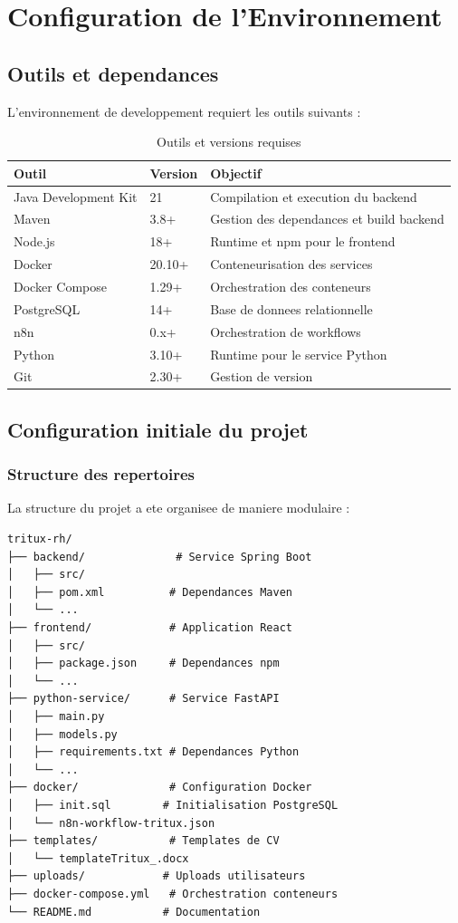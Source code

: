 \section{Configuration de l'Environnement}

\subsection{Outils et dependances}

L'environnement de developpement requiert les outils suivants :

\begin{table}[!ht]
\centering
\begin{tabular}{p{4cm}p{3cm}p{4cm}}
\toprule
\textbf{Outil} & \textbf{Version} & \textbf{Objectif} \\
\midrule
Java Development Kit & 21 & Compilation et execution du backend \\
Maven & 3.8+ & Gestion des dependances et build backend \\
Node.js & 18+ & Runtime et npm pour le frontend \\
Docker & 20.10+ & Conteneurisation des services \\
Docker Compose & 1.29+ & Orchestration des conteneurs \\
PostgreSQL & 14+ & Base de donnees relationnelle \\
n8n & 0.x+ & Orchestration de workflows \\
Python & 3.10+ & Runtime pour le service Python \\
Git & 2.30+ & Gestion de version \\
\bottomrule
\end{tabular}
\caption{Outils et versions requises}
\label{tab:outils-versions}
\end{table}

\subsection{Configuration initiale du projet}

\subsubsection{Structure des repertoires}

La structure du projet a ete organisee de maniere modulaire :

\begin{verbatim}
tritux-rh/
├── backend/              # Service Spring Boot
│   ├── src/
│   ├── pom.xml          # Dependances Maven
│   └── ...
├── frontend/            # Application React
│   ├── src/
│   ├── package.json     # Dependances npm
│   └── ...
├── python-service/      # Service FastAPI
│   ├── main.py
│   ├── models.py
│   ├── requirements.txt # Dependances Python
│   └── ...
├── docker/              # Configuration Docker
│   ├── init.sql        # Initialisation PostgreSQL
│   └── n8n-workflow-tritux.json
├── templates/           # Templates de CV
│   └── templateTritux_.docx
├── uploads/            # Uploads utilisateurs
├── docker-compose.yml   # Orchestration conteneurs
└── README.md           # Documentation
\end{verbatim}

